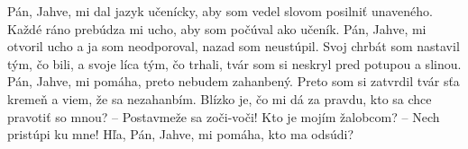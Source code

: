 Pán, Jahve, mi dal jazyk učenícky,
aby som vedel slovom posilniť unaveného.
Každé ráno prebúdza mi ucho,
aby som počúval ako učeník.
Pán, Jahve, mi otvoril ucho
a ja som neodporoval,
nazad som neustúpil.
Svoj chrbát som nastavil tým, čo bili,
a svoje líca tým, čo trhali,
tvár som si neskryl
pred potupou a slinou.
Pán, Jahve, mi pomáha,
preto nebudem zahanbený.
Preto som si zatvrdil tvár sťa kremeň
a viem, že sa nezahanbím.
Blízko je, čo mi dá za pravdu,
kto sa chce pravotiť so mnou? –
Postavmeže sa zoči-voči!
Kto je mojím žalobcom? –
Nech pristúpi ku mne!
Hľa, Pán, Jahve, mi pomáha,
kto ma odsúdi?